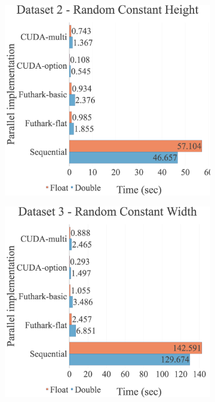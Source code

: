 \begin{figure}[H]
\begin{adjustwidth}{-2cm}{-2cm}
\begin{subfigure}{.62\textwidth}
\end{subfigure}
\par\bigskip
\par\bigskip
\begin{subfigure}{.62\textwidth}
  \centering
  \includegraphics[width=1\textwidth]{img/experiments/all-approaches-2_RANDCONSTHEIGHT.png}
\end{subfigure}
\begin{subfigure}{.62\textwidth}
  \centering
  \includegraphics[width=1\textwidth]{img/experiments/all-approaches-3_RANDCONSTWIDTH.png}
\end{subfigure}
\end{adjustwidth}
\end{figure}

